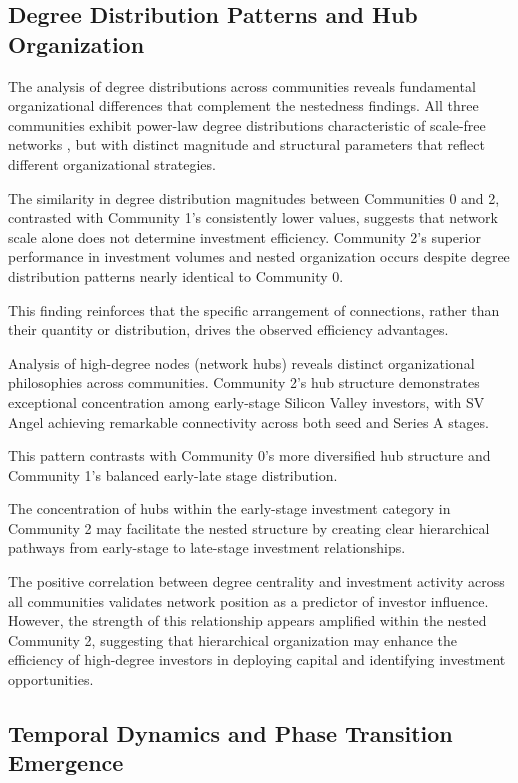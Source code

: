 \subsection{Degree Distribution Patterns and Hub Organization}

The analysis of degree distributions across communities reveals fundamental organizational differences that complement the nestedness findings. All three communities exhibit power-law degree distributions characteristic of scale-free networks \cite{Borgatti2011}, but with distinct magnitude and structural parameters that reflect different organizational strategies.

The similarity in degree distribution magnitudes between Communities 0 and 2, contrasted with Community 1's consistently lower values, suggests that network scale alone does not determine investment efficiency. Community 2's superior performance in investment volumes and nested organization occurs despite degree distribution patterns nearly identical to Community 0. 

This finding reinforces that the specific arrangement of connections, rather than their quantity or distribution, drives the observed efficiency advantages.

Analysis of high-degree nodes (network hubs) reveals distinct organizational philosophies across communities. Community 2's hub structure demonstrates exceptional concentration among early-stage Silicon Valley investors, with SV Angel achieving remarkable connectivity across both seed and Series A stages. 

This pattern contrasts with Community 0's more diversified hub structure and Community 1's balanced early-late stage distribution. 

The concentration of hubs within the early-stage investment category in Community 2 may facilitate the nested structure by creating clear hierarchical pathways from early-stage to late-stage investment relationships.

The positive correlation between degree centrality and investment activity across all communities validates network position as a predictor of investor influence. However, the strength of this relationship appears amplified within the nested Community 2, suggesting that hierarchical organization may enhance the efficiency of high-degree investors in deploying capital and identifying investment opportunities.

\subsection{Temporal Dynamics and Phase Transition Emergence}

